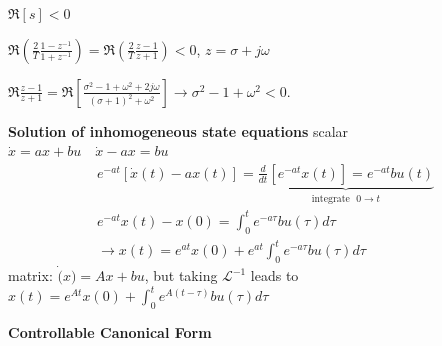  $\Re[s] < 0$

$\displaystyle \Re \left(\frac{2}{T} \frac{1-z^{-1}}{1+z^{-1}}\right)= \Re \left(\frac{2}{T}\frac{z-1}{z+1}\right) < 0$, $z= \sigma + j \omega$ \hfill \nopagebreak

$\displaystyle \Re \frac{z-1}{z+1}=\Re \left[\frac{\sigma^2-1+\omega^2+2j\omega}{(\sigma+1)^2+\omega^2}\right] \rightarrow \sigma^2-1+\omega^2 < 0$.


\textbf{Solution of inhomogeneous state equations}
scalar $\dot{x}=ax+bu \quad \dot{x}-ax=bu$
\begin{align*}
& e^{-at}[\dot{x}(t)-ax(t)]=\underbrace{\frac{d}{dt}[e^{-at}x(t)]=e^{-at}bu(t)}_{\text{integrate ~$0 \rightarrow t$}} \\
& e^{-at}x(t)-x(0) = \int^t_0 e^{-a \tau}bu(\tau) d\tau \\
& \rightarrow x(t)=e^{at}x(0)+e^{at}\int_0^te^{-a\tau}bu(\tau)d\tau
\end{align*}
matrix: $\dot(x)=Ax+bu$, but taking $\mathcal{L}^{-1}$ leads to  \hfill \break  $x(t)=e^{At}x(0)+\int_{0}^{t}e^{A(t-\tau)}bu(\tau) d\tau$

\textbf{Controllable Canonical Form} \hfill \nopagebreak

